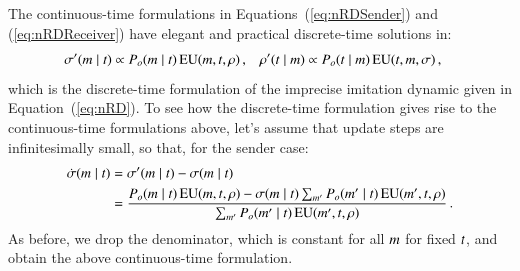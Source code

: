 \documentclass[fleqn,reqno,10pt]{article}
\begin{document}
The continuous-time formulations in Equations~(\ref{eq:nRDSender}) and (\ref{eq:nRDReceiver})
have elegant and practical discrete-time solutions in:
\begin{align*}
  \sigma'(m \mid t) & \propto P_o(m \mid t) \thinspace \mathrm{EU}(m,
  t, \rho)\,, & \rho'(t \mid m) & \propto P_o(t \mid m)
  \thinspace \mathrm{EU}(t, m, \sigma)\,,
\end{align*}
which is the discrete-time formulation of the imprecise imitation dynamic given in
Equation~(\ref{eq:nRD}). To see how the discrete-time formulation gives rise to the
continuous-time formulations above, let's assume that update steps are infinitesimally small,
so that, for the sender case:
\begin{align*}
  \dot{\sigma}(m \mid t) & = \sigma'(m \mid t) - \sigma(m
  \mid t)\\
  &= \frac{P_o(m \mid t) \thinspace \mathrm{EU}(m, t, \rho) - \sigma(m
    \mid t) \sum_{m'} P_o(m' \mid t) \thinspace \mathrm{EU}(m', t,
    \rho) }{ \sum_{m'} P_o(m' \mid t) \thinspace \mathrm{EU}(m', t,
    \rho)}\,.
\end{align*}
As before, we drop the denominator, which is constant for all $m$ for fixed $t$, and
obtain the above continuous-time formulation.


\printbibliography[heading=bibintoc]
\end{document}
